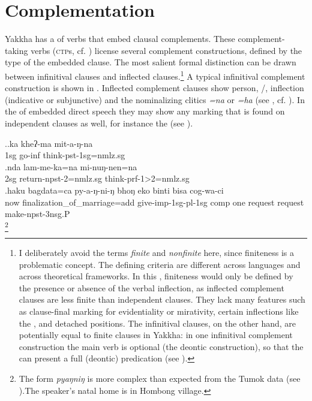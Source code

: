 \chapter{Complementation}\label{compl}

Yakkha has a  of  verbs that embed  clausal complements. These com\-ple\-ment-taking verbs (\textsc{ctp}s, cf. \citealt{Noonan2007Complementation}) license several complement constructions, defined by the type of the embedded clause. The most salient formal distinction can be drawn between infinitival clauses and inflected clauses.\footnote{I deliberately avoid the terms \emph{finite} and \emph{nonfinite} here, since finiteness is a problematic concept. The defining criteria are different across languages and across theoretical frameworks. In this , finiteness would only be defined by the presence or absence of the verbal inflection, as inflected complement clauses are less finite than independent clauses. They lack many features such as clause-final marking for evidentiality or mirativity, certain  inflections like the , and detached positions. The infinitival clauses, on the other hand, are potentially equal to finite clauses in Yakkha: in one infinitival complement construction the main verb is optional (the deontic construction), so that the  can present a full (deontic) predication (see ).} A typical infinitival complement construction is shown in \Next[a]. Inflected complement clauses show person, /,  inflection (indicative  or subjunctive) and the nominalizing clitics \emph{=na} or \emph{=ha}  (see \Next[b], cf. ). In the  of embedded direct speech they may show any marking that is found on independent clauses as well, for instance the (see \Next[c]). 

\ex.\ag.ka kheʔ-ma mit-a-ŋ-na\\
{\sc 1sg} go{\sc -inf} think{\sc -pst-1sg=nmlz.sg}\\
\bg.nda lam-me-ka=na mi-nuŋ-nen=na\\
{\sc 2sg} return{\sc -npst-2=nmlz.sg} think{\sc -prf-1>2=nmlz.sg}\\
\bg.haku bagdata=ca   py-a-ŋ-ni-ŋ  bhoŋ eko binti   bisa       cog-wa-ci\\
now finalization\_of\_marriage{\sc =add} give{\sc -imp-1sg-pl-1sg} {\sc comp} one request request make{\sc -npst-3nsg.P}\\
\footnote{The form \emph{pyaŋniŋ} is more complex than expected from the Tumok data (see ).The speaker's natal home is in Hombong village.} 


